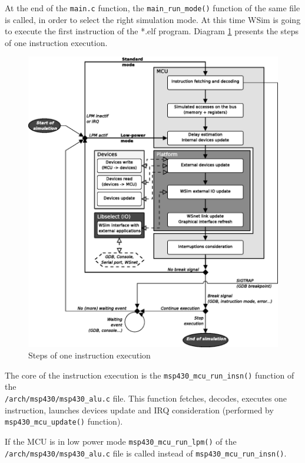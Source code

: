 \documentclass[a4paper,10pt]{report}
\begin{document}
At the end of the \verb$main.c$ function, the  \verb$main_run_mode()$ function of the same file is called, in order to select the right simulation mode. At this time WSim is going to execute the first instruction of the *.elf program. Diagram \ref{wsim-instruction} presents the steps of one instruction execution.

\begin{figure}[ht]
\begin{center}
  \includegraphics[scale=0.8]{figures/wsim_diag_execution.eps}
\end{center}
\caption{Steps of one instruction execution}
\label{wsim-instruction}
\end{figure}

The core of the instruction execution is the \verb$msp430_mcu_run_insn()$ function of the\\ \verb$/arch/msp430/msp430_alu.c$ file. This function fetches, decodes, executes one instruction, launches devices update and IRQ consideration (performed by \verb$msp430_mcu_update()$ function).

If the MCU is in low power mode \verb$msp430_mcu_run_lpm()$ of the \verb$/arch/msp430/msp430_alu.c$ file is called instead of \verb$msp430_mcu_run_insn()$.\\
\end{document}
